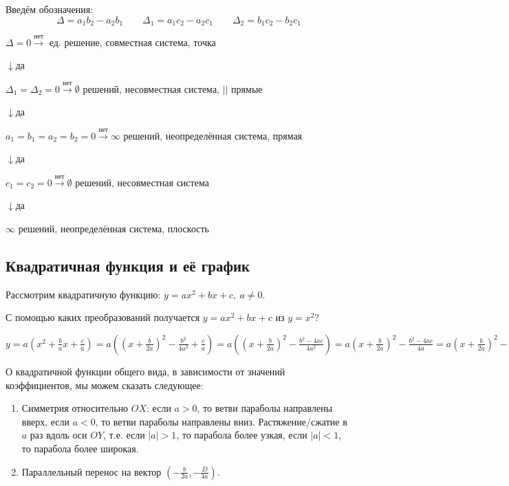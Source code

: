\documentclass{article}
\begin{document}
    Введём обозначения:
    \[\Delta = a_1b_2 - a_2b_1\qquad \Delta_1 = a_1c_2 - a_2c_1\qquad \Delta_2 = b_1c_2 - b_2c_1\]

    \(\Delta = 0 \overset{\textrm{нет}}{\longrightarrow}\) ед. решение, совместная система, точка

    \(\downarrow\)да

    \(\Delta_1 = \Delta_2 = 0 \overset{\textrm{нет}}{\longrightarrow} \emptyset\) решений, несовместная система, \(||\) прямые

    \(\downarrow\)да

    \(a_1 = b_1 = a_2 = b_2 = 0 \overset{\textrm{нет}}{\longrightarrow} \infty\) решений, неопределённая система, прямая

    \(\downarrow\)да

    \(c_1 = c_2 = 0 \overset{\textrm{нет}}{\longrightarrow} \emptyset\) решений, несовместная система

    \(\downarrow\)да

    \(\infty\) решений, неопределённая система, плоскость

    \subsection{Квадратичная функция и её график}

    Рассмотрим квадратичную функцию: \(y = ax^2+bx+c,\ a \not = 0\).

    С помощью каких преобразований получается \(y=ax^2+bx+c\) из \(y=x^2\)?

    \(y = a(x^2+\frac{b}{a}x+\frac{c}{a})=a((x+\frac{b}{2a})^2 - \frac{b^2}{4a^2}+\frac{c}{a})=a((x+\frac{b}{2a})^2 - \frac{b^2-4ac}{4a^2})=
    a(x+\frac{b}{2a})^2-\frac{b^2-4ac}{4a}=a(x+\frac{b}{2a})^2 - \frac{D}{4a}\)

    О квадратичной функции общего вида, в зависимости от значений коэффициентов, мы можем сказать следующее:

    \begin{enumerate}
        \item Симметрия относительно \(OX\): если \(a>0\), то ветви параболы направлены вверх, если \(a<0\), то ветви параболы направлены вниз. Растяжение/сжатие в \(a\) раз вдоль оси \(OY\), т.е. если \(|a|>1\), то парабола более узкая, если \(|a|<1\), то парабола более широкая.
        \item Параллельный перенос на вектор \((-\frac{b}{2a}, -\frac{D}{4a})\).
    \end{enumerate}
\end{document}
